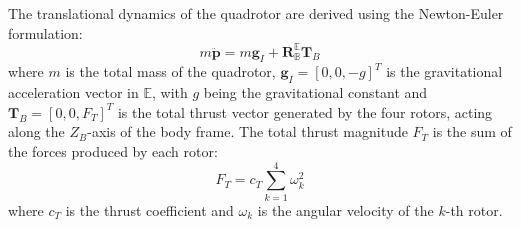 The translational dynamics of the quadrotor are derived using the Newton-Euler formulation:
\begin{equation}
\label{eq:translational_dyn_quad}
m \ddot{\mathbf{p}} = m \mathbf{g}_I + \mathbf{R}_{\mathbb{B}}^{\mathbb{E}} \mathbf{T}_B
\end{equation}
where $m$ is the total mass of the quadrotor, $\mathbf{g}_I = [0, 0, -g]^T$ is the gravitational acceleration vector in $\mathbb{E}$, with $g$ being the gravitational constant and $\mathbf{T}_B = [0, 0, F_T]^T$ is the total thrust vector generated by the four rotors, acting along the $Z_B$-axis of the body frame. The total thrust magnitude $F_T$ is the sum of the forces produced by each rotor:
\begin{equation}
\label{eq:total_thrust_quad}
F_T = c_T \sum_{k=1}^{4} \omega_{k}^2
\end{equation}
where $c_T$ is the thrust coefficient and $\omega_{k}$ is the angular velocity of the $k$-th rotor.

